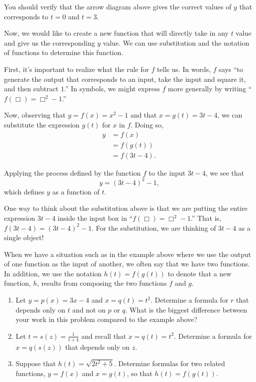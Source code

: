 \documentclass{ximera}
\begin{document}
\begin{example}
\begin{explanation}
You should verify that the arrow diagram above gives the correct values of $y$ that corresponds to $t=0$ and $t=3$.

Now, we would like to create a new function that will directly take in any $t$ value and give us the corresponding $y$ value.  We can use substitution and the notation of functions to determine this function.

First, it's important to realize what the rule for $f$ tells us.  In words, $f$ says ``to generate the output that corresponds to an input, take the input and square it, and then subtract $1$.''  In symbols, we might express $f$ more generally by writing ``$f(\Box) = \Box^2 - 1$.''

Now, observing that $y = f(x) = x^2 - 1$ and that $x = g(t) = 3t - 4$, we can substitute the expression $g(t)$ for $x$ in $f$.  Doing so,%
\begin{align*}
y &= f(x)\\
&= f(g(t))\\
&= f(3t-4)\text{.}
\end{align*}

Applying the process defined by the function $f$ to the input $3t-4$, we see that%
\begin{equation*}
y = (3t-4)^2 - 1\text{,}
\end{equation*}
which defines $y$ as a function of $t$.

One way to think about the substitution above is that we are putting the entire expression $3t-4$ inside the input box in ``$f(\Box) = \Box^2 - 1$.''   That is, $f \left( \boxed{3t-4} \right) = \left( \boxed{3t-4} \right) ^2 -1$.  For the substitution, we are thinking of $3t-4$ as a single object! 

\end{explanation}
\end{example}

When we have a situation such as in the example above where we use the output of one function as the input of another, we often say that we have  two functions.  In addition, we use the notation $h(t) = f(g(t))$ to denote that a new function, $h$, results from composing the two functions $f$ and $g$.


\begin{exploration}
\begin{enumerate}[label=\alph*.]
\item Let $y = p(x) = 3x - 4$ and $x = q(t) = t^2$.   Determine a formula for $r$ that depends only on $t$ and not on $p$ or $q$.  What is the biggest difference between your work in this problem compared to the example above?
\item Let $t = s(z) = \frac{1}{t+4}$ and recall that $x = q(t) = t^2$.  Determine a formula for $x = q(s(z))$ that depends only on $z$.
\item Suppose that $h(t) = \sqrt{2t^2 + 5}$.  Determine formulas for two related functions, $y = f(x)$ and $x = g(t)$, so that $h(t) = f(g(t))$.
\end{enumerate}
\end{exploration}
\end{document}
